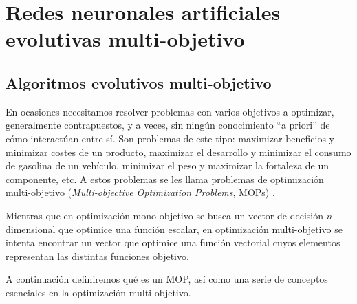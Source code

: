 \chapter{Redes neuronales artificiales evolutivas multi-objetivo}\label{MOEANNs}
\section{Algoritmos evolutivos multi-objetivo}\label{multiobjetivo}
\noindent  En ocasiones necesitamos resolver problemas con varios
objetivos a optimizar, generalmente contrapuestos, y a veces, sin  ningún  conocimiento
“a priori” de  cómo  interactúan entre sí. Son problemas de este tipo: maximizar
beneficios y minimizar costes de un producto, maximizar el desarrollo y minimizar el
consumo de gasolina de un vehículo, minimizar el peso y maximizar la fortaleza de un
componente, etc.
A estos problemas se les llama problemas de optimización multi-objetivo
(\textit{Multi-objective Optimization Problems}, MOPs) \cite{Deb2004,Coello2007}.

Mientras que en optimización mono-objetivo se busca un vector de decisión $n$-dimensional
que optimice una función escalar, en optimización multi-objetivo se intenta encontrar un
vector que optimice una función vectorial cuyos elementos representan las distintas
funciones objetivo.

A continuación definiremos qué es un MOP, así como una serie de conceptos esenciales en la
optimización multi-objetivo.
\newpage

